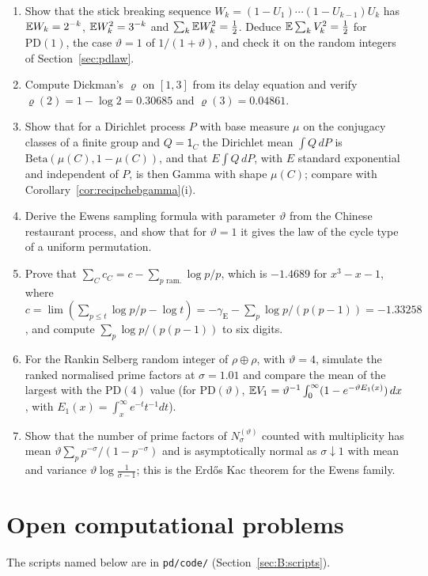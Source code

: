 \begin{enumerate}
\item Show that the stick breaking sequence $W_k=(1-U_1)\cdots(1-U_{k-1})U_k$ has $\mathbb{E} W_k=2^{-k}$, $\mathbb{E} W_k^2=3^{-k}$ and $\sum_k\mathbb{E} W_k^2=\frac12$. Deduce $\mathbb{E}\sum_kV_k^2=\frac12$ for $\mathrm{PD}(1)$, the case $\vartheta=1$ of $1/(1+\vartheta)$, and check it on the random integers of Section~\ref{sec:pdlaw}.
\item Compute Dickman's $\varrho$ on $[1,3]$ from its delay equation and verify $\varrho(2)=1-\log2=0.30685$ and $\varrho(3)=0.04861$.
\item Show that for a Dirichlet process $P$ with base measure $\mu$ on the conjugacy classes of a finite group and $Q=\mathsf1_C$ the Dirichlet mean $\int Q\,dP$ is $\mathrm{Beta}(\mu(C),1-\mu(C))$, and that $E\int Q\,dP$, with $E$ standard exponential and independent of $P$, is then Gamma with shape $\mu(C)$; compare with Corollary~\ref{cor:recipchebgamma}(i).
\item Derive the Ewens sampling formula with parameter $\vartheta$ from the Chinese restaurant process, and show that for $\vartheta=1$ it gives the law of the cycle type of a uniform permutation.
\item Prove that $\sum_Cc_C=c-\sum_{p\text{ ram.}}\log p/p$, which is $-1.4689$ for $x^3-x-1$, where $c=\lim(\sum_{p\le t}\log p/p-\log t)=-\gamma_{\mathrm E}-\sum_p\log p/(p(p-1))=-1.33258$, and compute $\sum_p\log p/(p(p-1))$ to six digits.
\item For the Rankin Selberg random integer of $\rho\oplus\rho$, with $\vartheta=4$, simulate the ranked normalised prime factors at $\sigma=1.01$ and compare the mean of the largest with the $\mathrm{PD}(4)$ value (for $\mathrm{PD}(\vartheta)$, $\mathbb{E} V_1=\vartheta^{-1}\int_0^\infty(1-e^{-\vartheta E_1(x)})\,dx$, with $E_1(x)=\int_x^\infty e^{-t}t^{-1}dt$).
\item Show that the number of prime factors of $N_\sigma^{(\vartheta)}$ counted with multiplicity has mean $\vartheta\sum_pp^{-\sigma}/(1-p^{-\sigma})$ and is asymptotically normal as $\sigma\downarrow1$ with mean and variance $\vartheta\log\frac1{\sigma-1}$; this is the Erd\H{o}s Kac theorem for the Ewens family.
\end{enumerate}

\section{Open computational problems}

The scripts named below are in \texttt{pd/code/} (Section~\ref{sec:B:scripts}).

